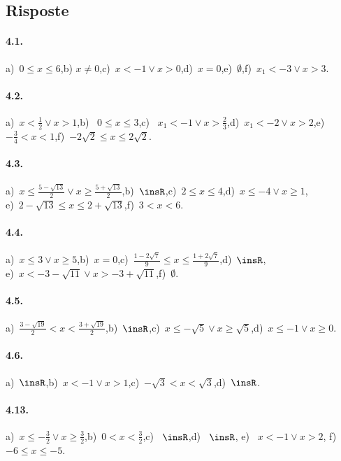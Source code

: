 \subsection{Risposte}
\paragraph{4.1.} a)~$0\le x\le 6$,\quad b) $x\neq 0$,\quad c)~$x<-1\vee x>0$,\quad d)~$x=0$,\quad e)~$\emptyset $,\quad f)~$x_1<-3\vee x>3$.

\paragraph{4.2.} a)~$x<\frac 1 2\vee x>1$,\quad b)~ $0\le x\le 3$,\quad c)~ $x_1<-1\vee x>\frac 2 3$,\quad d)~$x_1<-2\vee x>2$,\quad e)~$-\frac 3 4<x<1$,\quad f)~$-2\sqrt 2\le x\le 2\sqrt 2$.

\paragraph{4.3.} a)~$x\le \frac{5-\sqrt{13}} 2\vee x\ge \frac{5+\sqrt{13}} 2$,\quad b)~$\insR$,\quad c)~$2\le x\le 4$,\quad d)~$x\le -4\vee x\ge 1$,\protect \\ e)~$2-\sqrt{13}\le x\le 2+\sqrt{13}$,\quad f)~$3<x<6$.

\paragraph{4.4.} a)~$x\le 3\vee x\ge 5$,\quad b)~$x=0$,\quad c)~$\frac{1-2\sqrt 7} 9\le x\le \frac{1+2\sqrt 7} 9$,\quad d)~$\insR$,\protect \\ e)~$x<-3-\sqrt{11}\vee x>-3+\sqrt{11}$,\quad f)~$\emptyset $.

\paragraph{4.5.} a)~$\frac{3-\sqrt{19}} 2<x<\frac{3+\sqrt{19}} 2$,\quad b)~$\insR$,\quad c)~$x\le -\sqrt 5\vee x\ge \sqrt 5$,\quad d)~$x\le -1\vee x\ge 0$.

\paragraph{4.6.} a)~$\insR$,\quad b)~$x<-1\vee x>1$,\quad c)~$-\sqrt 3<x<\sqrt 3$,\quad d)~$\insR$.

\paragraph{4.13.} a)~$x\le -\frac 3 2\vee x\ge \frac 3 2$,\quad b)~$0<x<\frac 3 2$,\quad c)~ $\insR$,\quad d)~ $\insR$,\; e)~ $x<-1\vee x>2$,\; f)~ $-6\le x\le -5$.

